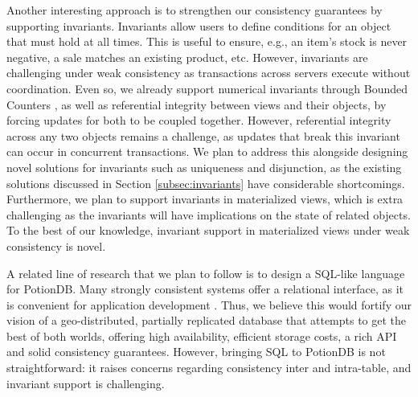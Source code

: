 
Another interesting approach is to strengthen our consistency guarantees by supporting invariants.
Invariants allow users to define conditions for an object that must hold at all times.
This is useful to ensure, e.g., an item's stock is never negative, a sale matches an existing product, etc. 
However, invariants are challenging under weak consistency as transactions across servers execute without coordination.
Even so, we already support numerical invariants through Bounded Counters \cite{boundedCounter}, as well as referential integrity between views and their objects, by forcing updates for both to be coupled together.
However, referential integrity across any two objects remains a challenge, as updates that break this invariant can occur in concurrent transactions.
We plan to address this alongside designing novel solutions for invariants such as uniqueness and disjunction, as the existing solutions discussed in Section \ref{subsec:invariants} have considerable shortcomings.
Furthermore, we plan to support invariants in materialized views, which is extra challenging as the invariants will have implications on the state of related objects.
To the best of our knowledge, invariant support in materialized views under weak consistency is novel.

A related line of research that we plan to follow is to design a SQL-like language for PotionDB.
Many strongly consistent systems offer a relational interface, as it is convenient for application development \cite{analyticdb, clickhouse, cassandra}.
Thus, we believe this would fortify our vision of a geo-distributed, partially replicated database that attempts to get the best of both worlds, offering high availability, efficient storage costs, a rich API and solid consistency guarantees.
However, bringing SQL to PotionDB is not straightforward: it raises concerns regarding consistency inter and intra-table, and invariant support is challenging.

